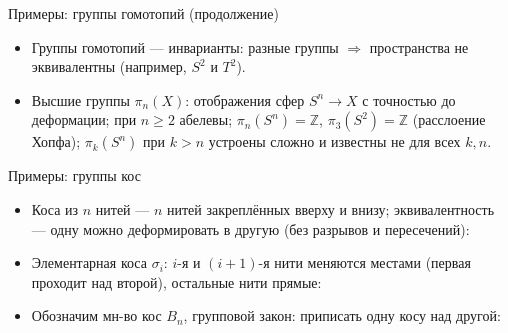 \documentclass[serif, aspectratio=169]{beamer}
\newcommand{\braididentity}[4][3]{%
  \foreach \i/\c in {0/blue!70!black,1/red!70!black,2/green!50!black,3/orange!90!black}{%
    \ifnum\i<#1 \draw[\c, line width=#4] (#2+\i*0.35,0) -- ++(0,#3);\fi}%
}
\begin{document}
\begin{frame}{Примеры: группы гомотопий (продолжение)}
{\begin{itemize}
            \item Группы гомотопий --- инварианты: разные группы $\Rightarrow$ пространства не эквивалентны (например, $S^2$ и $T^2$).
            \item Высшие группы $\pi_n(X)$: отображения сфер $S^n\to X$ с точностью до деформации; при $n\ge2$ абелевы; $\pi_n(S^n)=\mathbb{Z}$, $\pi_3(S^2)=\mathbb{Z}$ (расслоение Хопфа); $\pi_k(S^n)$ при $k>n$ устроены сложно и известны не для всех $k,n$.
        \end{itemize}
    }
\end{frame}

\begin{frame}{Примеры: группы кос}
    \begin{itemize}
        \item Коса из $n$ нитей --- $n$ нитей закреплённых вверху и внизу; эквивалентность --- одну можно деформировать в другую (без разрывов и пересечений):
        \begin{center}
        \end{center}
        \item Элементарная коса $\sigma_i$: $i$-я и $(i+1)$-я нити меняются местами (первая проходит над второй), остальные нити прямые:
        \begin{center}
        \end{center}
        \item Обозначим мн-во кос $B_n$, групповой закон: приписать одну косу над другой:

\end{itemize}
\end{frame}
\end{document}
